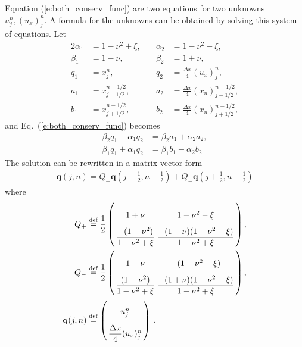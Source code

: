 \documentclass{turgon}
\begin{document}
Equation (\ref{e:both_conserv_func}) are two equations for two unknowns $u_j^n,
(u_x)_j^n$.  A formula for the unknowns can be obtained by solving this system
of equations.  Let
\begin{alignat*}{2}
  \alpha_1 &= 1-\nu^2+\xi, \quad &\alpha_2 &= 1-\nu^2-\xi, \\
  \beta_1 &= 1-\nu, &\beta_2 &= 1+\nu, \\
  q_1 &= x_j^n, &q_2 &= \frac{\Delta x}{4}(u_x)_j^n, \\
  a_1 &= x_{j-1/2}^{n-1/2},
 &a_2 &= \frac{\Delta x}{4}(x_n)_{j-1/2}^{n-1/2}, \\
  b_1 &= x_{j+1/2}^{n-1/2},
 &b_2 &= \frac{\Delta x}{4}(x_n)_{j+1/2}^{n-1/2},
\end{alignat*}
and Eq.~(\ref{e:both_conserv_func}) becomes
\begin{align*}
  \beta_2q_1 - \alpha_1q_2 &= \beta_2a_1 + \alpha_2a_2, \\
  \beta_1q_1 + \alpha_1q_2 &= \beta_1b_1 - \alpha_2b_2
\end{align*}
The solution can be rewritten in a matrix-vector form
\begin{align*}
  \mathbf{q}(j,n) =
    Q_+\mathbf{q}(j-\frac{1}{2},n-\frac{1}{2})
  + Q_-\mathbf{q}(j+\frac{1}{2},n-\frac{1}{2})
\end{align*}
where
\begin{align*}
  Q_+ &\defeq
    \frac{1}{2}
    \left(
    \arraycolsep=1.4pt\def\arraystretch{2.2}
    \begin{array}{cc}
      1+\nu                                     &
      1-\nu^2-\xi                               \\
      \dfrac{-(1-\nu^2)}{1-\nu^2+\xi}            &
      \dfrac{-(1-\nu)(1-\nu^2-\xi)}{1-\nu^2+\xi}
    \end{array}\right), \\
  Q_- &\defeq
    \frac{1}{2}
    \left(
    \arraycolsep=1.4pt\def\arraystretch{2.2}
    \begin{array}{cc}
      1-\nu                                     &
      -(1-\nu^2-\xi)                            \\
      \dfrac{(1-\nu^2)}{1-\nu^2+\xi}             &
      \dfrac{-(1+\nu)(1-\nu^2-\xi)}{1-\nu^2+\xi}
    \end{array}\right), \\
  \mathbf{q}(j,n) &\defeq
    \left(
    \arraycolsep=1.4pt\def\arraystretch{2.2}
    \begin{array}{c}
      u_j^n \\ \dfrac{\Delta x}{4}(u_x)_j^n
    \end{array}\right) \,.
\end{align*}
\end{document}
